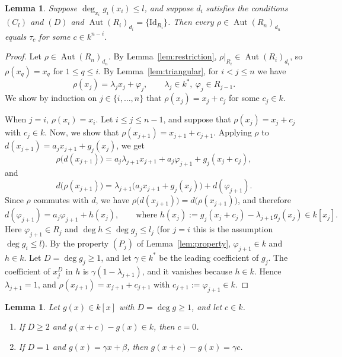 \documentclass[11pt]{amsart}
\newtheorem{lemma}[theorem]{Lemma}
\theoremstyle{definition}
\theoremstyle{remark}
\numberwithin{equation}{theorem}
\newcommand{\Aut}{\operatorname{Aut}}
\newcommand{\id}{\mathrm{Id}}
\begin{document}
\begin{lemma}\label{lem:translation}
Suppose $\deg_{x_i}g_i(x_i)\le l$, and suppose $d_i$ satisfies the conditions $(C_l)$ and $(D)$ and
$\Aut(R_i)_{d_i}=\{\id_{R_i}\}$. Then every $\rho\in\Aut(R_n)_{d_n}$ equals $\tau_c$ for some
$c\in k^{n-i}$.
\end{lemma}

\begin{proof}
Let $\rho\in\Aut(R_n)_{d_n}$. By Lemma~\ref{lem:restriction}, $\rho|_{R_i}\in\Aut(R_i)_{d_i}$, so
$\rho(x_q)=x_q$ for $1\le q\le i$. By Lemma~\ref{lem:triangular}, for $i<j\le n$ we have
\[
\rho(x_j)=\lambda_jx_j+\varphi_j,\qquad \lambda_j\in k^*,\ \varphi_j\in R_{j-1}.
\]
We show by induction on $j\in\{i,\dots,n\}$ that $\rho(x_j)=x_j+c_j$ for some $c_j\in k$.

When $j=i$, $\rho(x_i)=x_i$. Let $i\le j\le n-1$, and suppose that
$\rho(x_j)=x_j+c_j$ with $c_j\in k$. Now, we show that $\rho(x_{j+1})=x_{j+1}+c_{j+1}$. Applying $\rho$ to $d(x_{j+1})=a_jx_{j+1}+g_j(x_j)$, we get
\[
\rho\bigl(d(x_{j+1})\bigr)=a_j\lambda_{j+1}x_{j+1}+a_j\varphi_{j+1}+g_j(x_j+c_j),
\]
and
\[
d\bigl(\rho(x_{j+1})\bigr)=\lambda_{j+1}\bigl(a_jx_{j+1}+g_j(x_j)\bigr)+d(\varphi_{j+1}).
\]
Since $\rho$ commutes with $d$, we have $\rho\bigl(d(x_{j+1})\bigr)=d\bigl(\rho(x_{j+1})\bigr)$, and therefore
\begin{equation}\label{eq:phi}
d(\varphi_{j+1})=a_j\varphi_{j+1}+h(x_j),\qquad\text{where } h(x_j):=g_j(x_j+c_j)-\lambda_{j+1}g_j(x_j)\in k[x_j].
\end{equation}
Here $\varphi_{j+1}\in R_j$ and $\deg h\le\deg g_j\le l_j$ (for $j=i$ this is the assumption
$\deg g_i\le l$). By the property $(P_j)$ of Lemma~\ref{lem:property}, $\varphi_{j+1}\in k$ and
$h\in k$. Let $D=\deg g_j\ge1$, and let $\gamma\in k^*$ be the leading coefficient of $g_j$. The
coefficient of $x_j^D$ in $h$ is $\gamma(1-\lambda_{j+1})$, and it vanishes because $h\in k$. Hence
$\lambda_{j+1}=1$, and $\rho(x_{j+1})=x_{j+1}+c_{j+1}$ with $c_{j+1}:=\varphi_{j+1}\in k$.
\end{proof}

\begin{lemma}\label{lem:shift}
Let $g(x)\in k[x]$ with $D=\deg g\ge1$, and let $c\in k$.
\begin{enumerate}[label=\textup{(\arabic*)}]
\item If $D\ge2$ and $g(x+c)-g(x)\in k$, then $c=0$.
\item If $D=1$ and $g(x)=\gamma x+\beta$, then $g(x+c)-g(x)=\gamma c$.
\end{enumerate}
\end{lemma}
\end{document}
